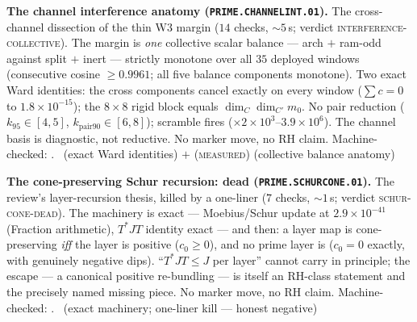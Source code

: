 \par\smallskip\noindent\textbf{The channel interference anatomy
(\texttt{PRIME.CHANNELINT.01}).}
The cross-channel dissection of the thin W3 margin ($14$ checks,
${\sim}5$\,s; verdict \textsc{interference-collective}).  The
margin is \emph{one} collective scalar balance --- arch $+$ ram-odd
against split $+$ inert --- strictly monotone over all $35$
deployed windows (consecutive cosine $\ge0.9961$; all five balance
components monotone).  Two exact Ward identities: the cross
components cancel exactly on every window ($\sum c=0$ to
$1.8\times10^{-15}$); the $8\times8$ rigid block equals
$\dim_C\dim_{C'}m_0$.  No pair reduction ($k_{95}\in[4,5]$,
$k_{\mathrm{pair}90}\in[6,8]$); scramble fires
($\times2\times10^3$--$3.9\times10^6$).  The channel basis is
diagnostic, not reductive.  No marker move, no RH claim.
Machine-checked: .
\mE\ (exact Ward identities) $+$ (\textsc{measured}) (collective
balance anatomy)
\par\smallskip


\par\smallskip\noindent\textbf{The cone-preserving Schur recursion:
dead (\texttt{PRIME.SCHURCONE.01}).}
The review's layer-recursion thesis, killed by a one-liner ($7$
checks, ${\sim}1$\,s; verdict \textsc{schur-cone-dead}).  The
machinery is exact --- Moebius/Schur update at $2.9\times10^{-41}$
(Fraction arithmetic), $T^*JT$ identity exact --- and then: a layer
map is cone-preserving \emph{iff} the layer is positive
($c_0\ge0$), and no prime layer is ($c_0=0$ exactly, with genuinely
negative dips).  ``$T^*JT\le J$ per layer'' cannot carry in
principle; the escape --- a canonical positive re-bundling --- is
itself an RH-class statement and the precisely named missing piece.
No marker move, no RH claim.
Machine-checked: .
\mE\ (exact machinery; one-liner kill --- honest negative)
\par\smallskip


